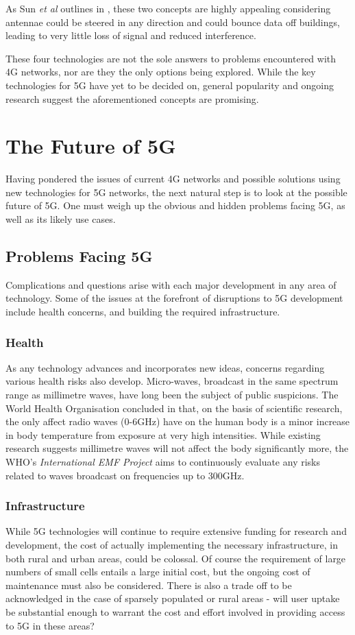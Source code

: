 \documentclass[journal]{IEEEtran}
\begin{document}
As Sun \textit{et al} outlines in \cite{beam_sm}, these two concepts are highly appealing considering antennae could be steered in any direction and could bounce data off buildings, leading to very little loss of signal and reduced interference.
\bigskip

These four technologies are not the sole answers to problems encountered with 4G networks, nor are they the only options being explored. While the key technologies for 5G have yet to be decided on, general popularity and ongoing research suggest the aforementioned concepts are promising.

\section{The Future of 5G}
Having pondered the issues of current 4G networks and possible solutions using new technologies for 5G networks, the next natural step is to look at the possible future of 5G. One must weigh up the obvious and hidden problems facing 5G, as well as its likely use cases.

\subsection{Problems Facing 5G}
Complications and questions arise with each major development in any area of technology. Some of the issues at the forefront of disruptions to 5G development include health concerns, and building the required infrastructure.

\subsubsection{Health}As any technology advances and incorporates new ideas, concerns regarding various health risks also develop. Micro-waves, broadcast in the same spectrum range as millimetre waves, have long been the subject of public suspicions. The World Health Organisation concluded in \cite{health} that, on the basis of scientific research, the only affect radio waves (0-6GHz) have on the human body is a minor increase in body temperature from exposure at very high intensities. While existing research suggests millimetre waves will not affect the body significantly more, the WHO's \textit{International EMF Project} \cite{emfproj} aims to continuously evaluate any risks related to waves broadcast on frequencies up to 300GHz.

\subsubsection{Infrastructure}While 5G technologies will continue to require extensive funding for research and development, the cost of actually implementing the necessary infrastructure, in both rural and urban areas, could be colossal. Of course the requirement of large numbers of small cells entails a large initial cost, but the ongoing cost of maintenance must also be considered. There is also a trade off to be acknowledged in the case of sparsely populated or rural areas - will user uptake be substantial enough to warrant the cost and effort involved in providing access to 5G in these areas? 
\end{document}
